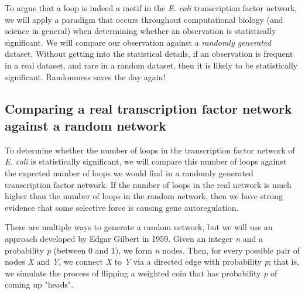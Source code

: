 To argue that a loop is indeed a motif in the \textit{E. coli} transcription factor network, we will apply a paradigm that occurs throughout computational biology (and science in general) when determining whether an observation is statistically significant. We will compare our observation against a  \textit{randomly generated} dataset. Without getting into the statistical details, if an observation is frequent in a real dataset, and rare in a random dataset, then it is likely to be statistically significant. Randomness saves the day again!

\begin{note}\end{note} 

 \begin{qbox}\end{qbox} 
 
\FloatBarrier
{}
\subsection{Comparing a real transcription factor network against a random network}

To determine whether the number of loops in the transcription factor network of \textit{E. coli} is statistically significant, we will compare this number of loops against the expected number of loops we would find in a randomly generated transcription factor network. If the number of loops in the real network is much higher than the number of loops in the random network, then we have strong evidence that some selective force is causing gene autoregulation.

There are multiple ways to generate a random network, but we will use an approach developed by Edgar Gilbert in 1959. Given an integer \textit{n} and a probability \textit{p} (between 0 and 1), we form \textit{n} nodes. Then, for every possible pair of nodes \textit{X} and \textit{Y}, we connect \textit{X} to \textit{Y} via a directed edge with probability \textit{p}; that is, we simulate the process of flipping a weighted coin that has probability \textit{p} of coming up "heads".

